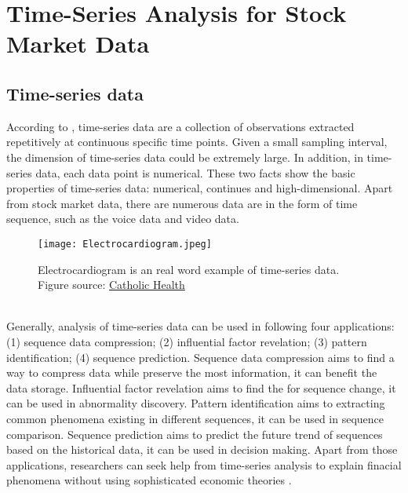 \section{Time-Series Analysis for Stock Market Data}
\subsection{Time-series data}
According to \cite{davis2014introduction}, time-series data are a collection of observations extracted repetitively at continuous specific time points. Given a small sampling interval, the dimension of time-series data could be extremely large. In addition, in time-series data, each data point is numerical. These two facts show the basic properties of time-series data: numerical, continues and high-dimensional. Apart from stock market data, there are numerous data are in the form of time sequence, such as the voice data and video data.\\
\begin{figure}[!htbp]
    \centering
    \texttt{[image: Electrocardiogram.jpeg]}
    \caption{Electrocardiogram is an real word example of time-series data. Figure source: \href{https://www.chsbuffalo.org/services/electrocardiogram}{Catholic Health}}
    \label{fig:ecg}
\end{figure} 
\\Generally, analysis of time-series data can be used in following four applications: (1) sequence data compression; (2) influential factor revelation; (3) pattern identification; (4) sequence prediction. Sequence data compression aims to find a way to compress data while preserve the most information, it can benefit the data storage. Influential factor revelation aims to find the for sequence change, it can be used in abnormality discovery. Pattern identification aims to extracting common phenomena existing in different sequences, it can be used in sequence comparison. Sequence prediction aims to predict the future trend of sequences based on the historical data, it can be used in decision making. Apart from those applications, researchers can seek help from time-series analysis to explain finacial phenomena without using sophisticated economic theories \cite{han1999efficient}. 

